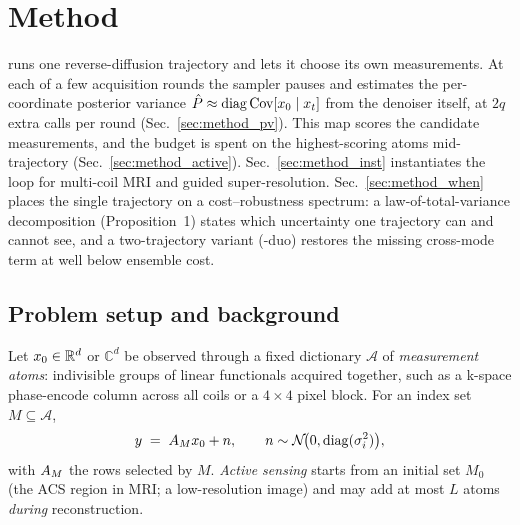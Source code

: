 \section{Method}\label{sec:method}

\pvas{} runs one reverse-diffusion trajectory and lets it choose its own
measurements. At each of a few acquisition rounds the sampler pauses and
estimates the per-coordinate posterior variance
$\hat{P} \approx \operatorname{diag}\operatorname{Cov}[x_0 \mid x_t]$ from
the denoiser itself, at $2q$ extra calls per round
(Sec.~\ref{sec:method_pv}). This map scores the candidate measurements,
and the budget is spent on the highest-scoring atoms mid-trajectory
(Sec.~\ref{sec:method_active}). Sec.~\ref{sec:method_inst} instantiates
the loop for multi-coil MRI and guided super-resolution.
Sec.~\ref{sec:method_when} places the single trajectory on a
cost--robustness spectrum: a law-of-total-variance decomposition
(Proposition~1) states which uncertainty one trajectory can and cannot
see, and a two-trajectory variant (\pvas-duo) restores the missing
cross-mode term at well below ensemble cost.

\subsection{Problem setup and background}\label{sec:method_setup}

Let $x_0 \in \mathbb{R}^d$ or $\mathbb{C}^d$ be observed through a fixed
dictionary $\mathcal{A}$ of \emph{measurement atoms}: indivisible groups
of linear functionals acquired together, such as a k-space phase-encode
column across all coils or a $4{\times}4$ pixel block. For an index set
$M \subseteq \mathcal{A}$,
\begin{equation}
  y \;=\; A_M x_0 + n, \qquad n \sim \mathcal{N}\!\big(0, \operatorname{diag}(\sigma_i^2)\big),
  \label{eq:forward}
\end{equation}
with $A_M$ the rows selected by $M$. \emph{Active sensing} starts from
an initial set $M_0$ (the ACS region in MRI; a low-resolution image) and
may add at most $L$ atoms \emph{during} reconstruction.

